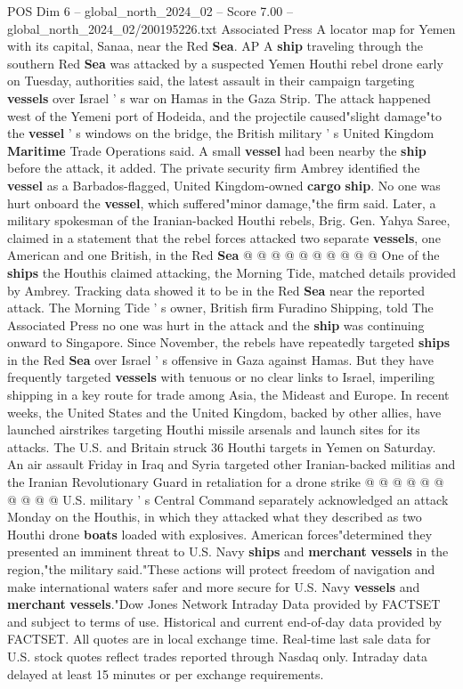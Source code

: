 \begin{textsample}{POS Dim 6 – global\_north\_2024\_02 – Score 7.00 – global\_north\_2024\_02/200195226.txt}  \label{ex:f6_pos_198}
Associated Press A locator map for Yemen with its capital, Sanaa, near the Red \textbf{Sea}.
AP A \textbf{ship} traveling through the southern Red \textbf{Sea} was attacked by a suspected Yemen Houthi rebel drone early on Tuesday, authorities said, the latest assault in their campaign targeting \textbf{vessels} over Israel ' s war on Hamas in the Gaza Strip.
The attack happened west of the Yemeni port of Hodeida, and the projectile caused"slight damage"to the \textbf{vessel} ' s windows on the bridge, the British military ' s United Kingdom \textbf{Maritime} Trade Operations said.
A small \textbf{vessel} had been nearby the \textbf{ship} before the attack, it added.
The private security firm Ambrey identified the \textbf{vessel} as a Barbados-flagged, United Kingdom-owned \textbf{cargo} \textbf{ship}.
No one was hurt onboard the \textbf{vessel}, which suffered"minor damage,"the firm said.
Later, a military spokesman of the Iranian-backed Houthi rebels, Brig.
Gen.
Yahya Saree, claimed in a statement that the rebel forces attacked two separate \textbf{vessels}, one American and one British, in the Red \textbf{Sea} @ @ @ @ @ @ @ @ @ @ One of the \textbf{ships} the Houthis claimed attacking, the Morning Tide, matched details provided by Ambrey.
Tracking data showed it to be in the Red \textbf{Sea} near the reported attack.
The Morning Tide ' s owner, British firm Furadino Shipping, told The Associated Press no one was hurt in the attack and the \textbf{ship} was continuing onward to Singapore.
Since November, the rebels have repeatedly targeted \textbf{ships} in the Red \textbf{Sea} over Israel ' s offensive in Gaza against Hamas.
But they have frequently targeted \textbf{vessels} with tenuous or no clear links to Israel, imperiling shipping in a key route for trade among Asia, the Mideast and Europe.
In recent weeks, the United States and the United Kingdom, backed by other allies, have launched airstrikes targeting Houthi missile arsenals and launch sites for its attacks.
The U.S. and Britain struck 36 Houthi targets in Yemen on Saturday.
An air assault Friday in Iraq and Syria targeted other Iranian-backed militias and the Iranian Revolutionary Guard in retaliation for a drone strike @ @ @ @ @ @ @ @ @ @ U.S. military ' s Central Command separately acknowledged an attack Monday on the Houthis, in which they attacked what they described as two Houthi drone \textbf{boats} loaded with explosives.
American forces"determined they presented an imminent threat to U.S.
Navy \textbf{ships} and \textbf{merchant} \textbf{vessels} in the region,"the military said."These actions will protect freedom of navigation and make international waters safer and more secure for U.S.
Navy \textbf{vessels} and \textbf{merchant} \textbf{vessels}."Dow Jones Network Intraday Data provided by FACTSET and subject to terms of use.
Historical and current end-of-day data provided by FACTSET.
All quotes are in local exchange time.
Real-time last sale data for U.S. stock quotes reflect trades reported through Nasdaq only.
Intraday data delayed at least 15 minutes or per exchange requirements.

\end{textsample}
